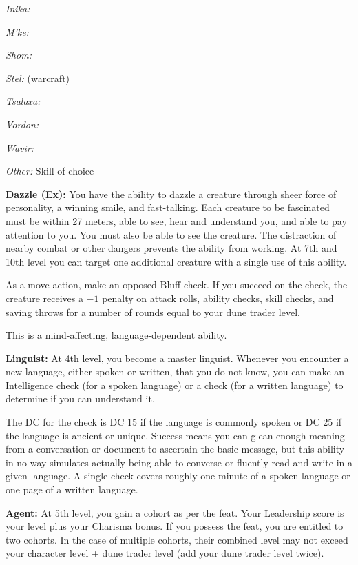 {\textit{Inika:} 

\textit{M'ke:} 

\textit{Shom:} 

\textit{Stel:}  (warcraft)

\textit{Tsalaxa:} 

\textit{Vordon:} 

\textit{Wavir:} 

\textit{Other:} Skill of choice

\textbf{Dazzle (Ex):} You have the ability to dazzle a creature through sheer force of personality, a winning smile, and fast-talking. Each creature to be fascinated must be within 27 meters, able to see, hear and understand you, and able to pay attention to you. You must also be able to see the creature. The distraction of nearby combat or other dangers prevents the ability from working. At 7th and 10th level you can target one additional creature with a single use of this ability.

As a move action, make an opposed Bluff check. If you succeed on the check, the creature receives a $-1$ penalty on attack rolls, ability checks, skill checks, and saving throws for a number of rounds equal to your dune trader level.

This is a mind-affecting, language-dependent ability.

\textbf{Linguist:} At 4th level, you become a master linguist. Whenever you encounter a new language, either spoken or written, that you do not know, you can make an Intelligence check (for a spoken language) or a  check (for a written language) to determine if you can understand it.

The DC for the check is DC 15 if the language is commonly spoken or DC 25 if the language is ancient or unique. Success means you can glean enough meaning from a conversation or document to ascertain the basic message, but this ability in no way simulates actually being able to converse or fluently read and write in a given language. A single check covers roughly one minute of a spoken language or one page of a written language.

\textbf{Agent:} At 5th level, you gain a cohort as per the  feat. Your Leadership score is your level plus your Charisma bonus. If you possess the  feat, you are entitled to two cohorts. In the case of multiple cohorts, their combined level may not exceed your character level + dune trader level (add your dune trader level twice).

}
